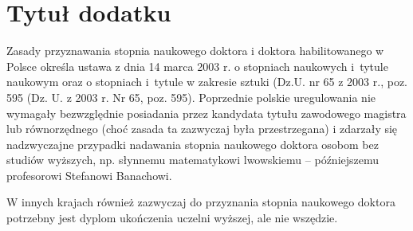 \chapter{Tytuł dodatku}
Zasady przyznawania stopnia naukowego doktora i doktora habilitowanego w Polsce określa ustawa z dnia 14 marca 2003 r. o stopniach naukowych i~tytule naukowym oraz o stopniach i~tytule w zakresie sztuki (Dz.U. nr 65 z 2003 r., poz. 595 (Dz. U. z 2003 r. Nr 65, poz. 595). Poprzednie polskie uregulowania nie wymagały bezwzględnie posiadania przez kandydata tytułu zawodowego magistra lub równorzędnego (choć zasada ta zazwyczaj była przestrzegana) i zdarzały się nadzwyczajne przypadki nadawania stopnia naukowego doktora osobom bez studiów wyższych, np. słynnemu matematykowi lwowskiemu – późniejszemu profesorowi Stefanowi Banachowi. 

W innych krajach również zazwyczaj do przyznania stopnia naukowego doktora potrzebny jest dyplom ukończenia uczelni wyższej, ale nie wszędzie.

